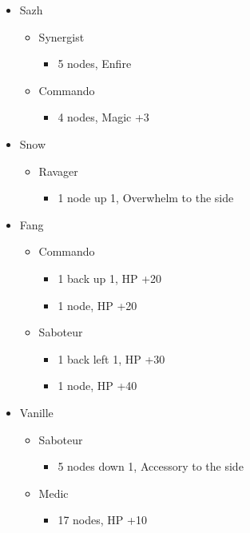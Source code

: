 \begin{menu}
\begin{itemize}
    \crystarium
    \begin{itemize}
        \item Sazh
        \begin{itemize}
            \item Synergist
            \begin{itemize}
                \item 5 nodes, Enfire
            \end{itemize}
            \item Commando
            \begin{itemize}
                \item 4 nodes, Magic +3
            \end{itemize}
        \end{itemize}
        \item Snow
        \begin{itemize}
            \item Ravager
            \begin{itemize}
                \item 1 node up 1, Overwhelm to the side
            \end{itemize}
        \end{itemize}
        \item Fang
        \begin{itemize}
            \item Commando
            \begin{itemize}
                \item 1 back up 1, HP +20
                \item 1 node, HP +20
            \end{itemize}
            \item Saboteur
            \begin{itemize}
                \item 1 back left 1, HP +30
                \item 1 node, HP +40
            \end{itemize}
        \end{itemize}
        \item Vanille
        \begin{itemize}
            \item Saboteur
            \begin{itemize}
                \item 5 nodes down 1, Accessory to the side
            \end{itemize}
            \item Medic
            \begin{itemize}
                \item 17 nodes, HP +10
            \end{itemize}
        \end{itemize}
    \end{itemize}
    
\end{itemize}
\end{menu}

